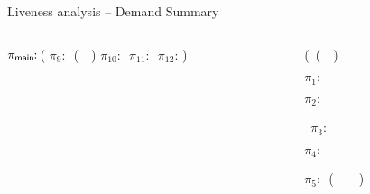 \begin{frame}{Liveness analysis -- Demand Summary}

\small
\begin{columns}[c]
 \begin{column}[T]{0.5\textwidth}
\hspace*{-.3cm}\renewcommand{\arraystretch}{1}{
	  \begin{uprogram}
	  \hspace*{-.2cm} $\pi_{\sf main}\!\!:\, $(\onslide<0>{\LET\  \pz\  $\leftarrow$ \ldots  \IN
	  \UNL{2}   \hspace*{.3cm}              (\LET\ \py\  $\leftarrow$  \ldots \IN}
             \hspace*{-.5cm}    $\pi_9\!\!:\, $  (\append\ \py\ \pz) 
             \hspace*{-.8cm}  $\pi_{10}\!\!:\, $
	     \hspace*{-1.1cm}  $\pi_{11}\!\!:\, $\onslide<0>{(\LET\ \pb\  $\leftarrow$ (\CAR\  \pa) \IN}
             \hspace*{-1.4cm} $\pi_{12}\!\!:\,$)
\end{uprogram}}
 \end{column}
 \begin{column}[T]{0.6\textwidth}
\hspace*{.4cm}  \renewcommand{\arraystretch}{1}{
  \begin{uprogram}
    \hspace*{-.7cm} (\DEFINE\ (\append~\lista~\listb)

    \hspace*{-1cm}  $\pi_1\!\!:\, $


     \hspace*{-1.4cm}     $\pi_2\!\!:\, $

~$\pi_3\!\!:$ 
 
          \hspace*{-1.8cm} \hspace*{.05cm}    
 $\pi_4\!\!:\, $

	  \hspace*{-2.1cm}  \hspace*{.05cm}
          $\pi_5\!\!:\,$ {  (\append\ \ \xtl\ \  \listb)}



\end{uprogram}}
\end{column}
\end{columns}
\end{frame}
